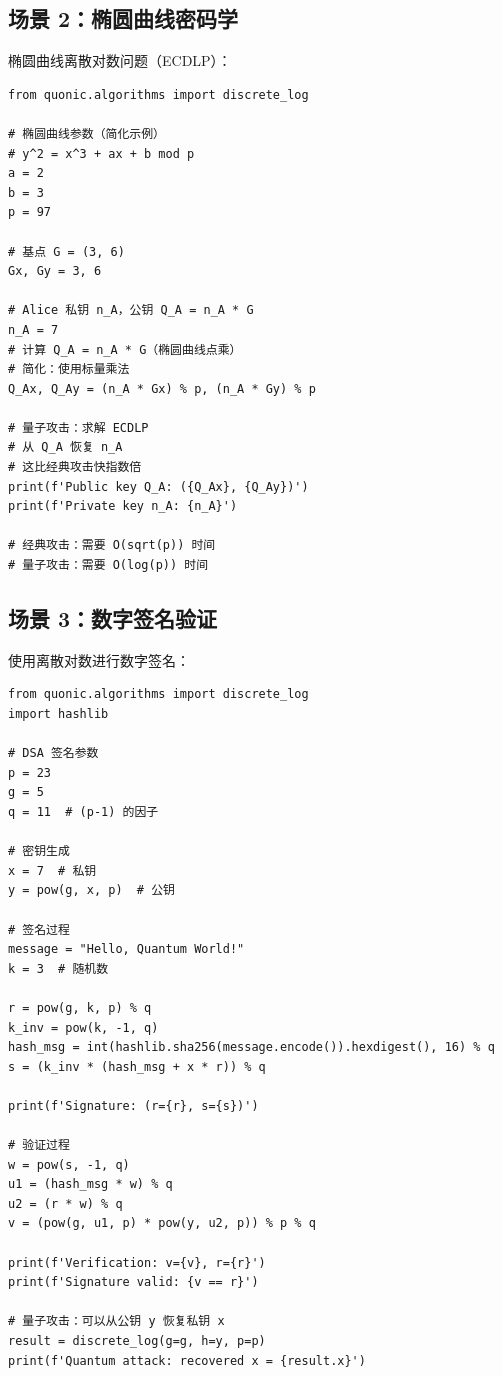 \documentclass[12pt,a4paper]{article}
\begin{document}
\subsection{场景 2：椭圆曲线密码学}

椭圆曲线离散对数问题（ECDLP）：

\begin{verbatim}
from quonic.algorithms import discrete_log

# 椭圆曲线参数（简化示例）
# y^2 = x^3 + ax + b mod p
a = 2
b = 3
p = 97

# 基点 G = (3, 6)
Gx, Gy = 3, 6

# Alice 私钥 n_A，公钥 Q_A = n_A * G
n_A = 7
# 计算 Q_A = n_A * G（椭圆曲线点乘）
# 简化：使用标量乘法
Q_Ax, Q_Ay = (n_A * Gx) % p, (n_A * Gy) % p

# 量子攻击：求解 ECDLP
# 从 Q_A 恢复 n_A
# 这比经典攻击快指数倍
print(f'Public key Q_A: ({Q_Ax}, {Q_Ay})')
print(f'Private key n_A: {n_A}')

# 经典攻击：需要 O(sqrt(p)) 时间
# 量子攻击：需要 O(log(p)) 时间
\end{verbatim}

\subsection{场景 3：数字签名验证}

使用离散对数进行数字签名：

\begin{verbatim}
from quonic.algorithms import discrete_log
import hashlib

# DSA 签名参数
p = 23
g = 5
q = 11  # (p-1) 的因子

# 密钥生成
x = 7  # 私钥
y = pow(g, x, p)  # 公钥

# 签名过程
message = "Hello, Quantum World!"
k = 3  # 随机数

r = pow(g, k, p) % q
k_inv = pow(k, -1, q)
hash_msg = int(hashlib.sha256(message.encode()).hexdigest(), 16) % q
s = (k_inv * (hash_msg + x * r)) % q

print(f'Signature: (r={r}, s={s})')

# 验证过程
w = pow(s, -1, q)
u1 = (hash_msg * w) % q
u2 = (r * w) % q
v = (pow(g, u1, p) * pow(y, u2, p)) % p % q

print(f'Verification: v={v}, r={r}')
print(f'Signature valid: {v == r}')

# 量子攻击：可以从公钥 y 恢复私钥 x
result = discrete_log(g=g, h=y, p=p)
print(f'Quantum attack: recovered x = {result.x}')
\end{verbatim}
\end{document}
